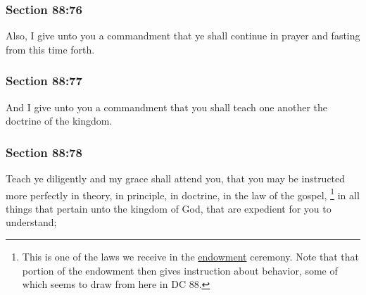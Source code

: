 	\subsubsection{Section 88:76} %
		\label{DC88-76}

		Also, I give unto you a commandment that ye shall continue in prayer and fasting from this time forth.


	\subsubsection{Section 88:77} %
		\label{DC88-77}

		And I give unto you a commandment that you shall teach one another the doctrine of the kingdom.


	\subsubsection{Section 88:78} %
		\label{DC88-78}

		Teach ye diligently and my grace shall attend you, that you may be instructed more perfectly in theory, in principle, in doctrine, in the law of the gospel,%
			\footnote{%
				This is one of the laws we receive in the \hyperref[TEMPLE-ENDOWMENT-ENDOW-PRE-1990-GOSPEL]{endowment} ceremony. Note that that portion of the endowment then gives instruction about behavior, some of which seems to draw from here in DC 88.
				}
		in all things that pertain unto the kingdom of God, that are expedient for you to understand;

